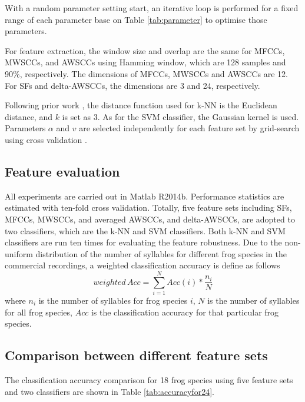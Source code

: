 With a random parameter setting start, an iterative loop is performed for a fixed range of each parameter base on Table \ref{tab:parameter} to optimise those parameters.

For feature extraction, the window size and overlap are the same for MFCCs, MWSCCs, and AWSCCs using Hamming window, which are 128 samples and 90\%, respectively. The dimensions of MFCCs, MWSCCs and AWSCCs are 12. For SFs and delta-AWSCCs, the dimensions are 3 and 24, respectively.

Following prior work \citep{huang2009frog, han2011acoustic, Xie1504:Acoustic}, the distance function used for k-NN is the Euclidean distance, and $k$ is set as 3. As for the SVM classifier, the Gaussian kernel is used. Parameters $\alpha$ and $v$ are selected independently for each feature set by grid-search using cross validation \citep{hsu2003practical}. 

\subsection{Feature evaluation}
All experiments are carried out in Matlab R2014b. Performance statistics are estimated with ten-fold cross validation. Totally, five feature sets including SFs, MFCCs, MWSCCs, and averaged AWSCCs, and delta-AWSCCs, are adopted to two classifiers, which are the k-NN and SVM classifiers. Both k-NN and SVM classifiers are run ten times for evaluating the feature robustness. Due to the non-uniform distribution of the number of syllables for different frog species in the commercial recordings, a weighted classification accuracy is define as follows
\begin{equation}
weighted \, Acc=\sum_{i=1}^{N}Acc(i)*\frac{n_{i}}{N}
\end{equation}
\noindent where $n_{i}$ is the number of syllables for frog species $i$, $N$ is the number of syllables for all frog species, $Acc$ is the classification accuracy for that particular frog species. 


\subsection{Comparison between different feature sets}
The classification accuracy comparison for 18 frog species using five feature sets and two classifiers are shown in Table \ref{tab:accuracyfor24}. 


